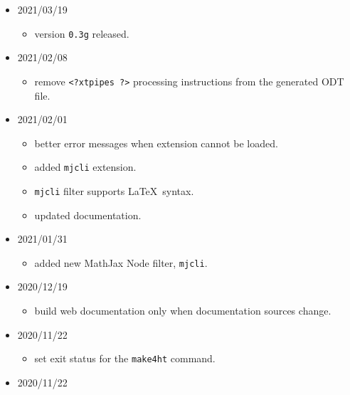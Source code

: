 \begin{itemize}
  \begin{itemize}
  \tightlist
  \item
    use \texttt{kpse} library when files are copied to the output
    directory.
  \item
    added \texttt{clean} mode. It removes all generated, temporary and
    auxilary files.
  \end{itemize}
\item
  2021/03/19

  \begin{itemize}
  \tightlist
  \item
    version \texttt{0.3g} released.
  \end{itemize}
\item
  2021/02/08

  \begin{itemize}
  \tightlist
  \item
    remove \texttt{\textless{}?xtpipes\ ?\textgreater{}} processing
    instructions from the generated ODT file.
  \end{itemize}
\item
  2021/02/01

  \begin{itemize}
  \tightlist
  \item
    better error messages when extension cannot be loaded.
  \item
    added \texttt{mjcli} extension.
  \item
    \texttt{mjcli} filter supports \LaTeX~syntax.
  \item
    updated documentation.
  \end{itemize}
\item
  2021/01/31

  \begin{itemize}
  \tightlist
  \item
    added new MathJax Node filter, \texttt{mjcli}.
  \end{itemize}
\item
  2020/12/19

  \begin{itemize}
  \tightlist
  \item
    build web documentation only when documentation sources change.
  \end{itemize}
\item
  2020/11/22

  \begin{itemize}
  \tightlist
  \item
    set exit status for the \texttt{make4ht} command.
  \end{itemize}
\item
  2020/11/22


\end{itemize}

